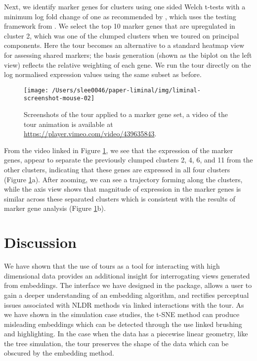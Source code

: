 \documentclass[article,notitle]{jdssv}
\begin{document}
Next, we identify marker genes for clusters using one sided Welch t-tests with
a minimum log fold change of one as recommended by \citet{Amezquita2020-at}, which
uses the testing framework from \citet{McCarthy2009-qx}. We select the top 10 marker
genes that are upregulated in cluster 2, which was one of the clumped clusters
when we toured on principal components. Here the tour becomes an alternative
to a standard heatmap view for assessing shared markers; the basis
generation (shown as the biplot on the left view) reflects the relative
weighting of each gene. We run the tour directly on the
log normalised expression values using the same subset as before.



\begin{figure}

{\centering \texttt{[image: /Users/slee0046/paper-liminal/img/liminal-screenshot-mouse-02]} 

}

\caption{Screenshots of the  tour applied to a marker gene set, a video of the tour animation is available at \url{https://player.vimeo.com/video/439635843}.}\label{fig:mouse-02}
\end{figure}

From the video linked in Figure \ref{fig:mouse-02}, we see that the
expression of the marker genes, appear to separate
the previously clumped clusters 2, 4, 6, and 11 from the other clusters,
indicating that these genes are expressed in all four clusters (Figure \ref{fig:mouse-02}a). After zooming, we can see a trajectory forming along
the clusters, while the axis view shows that magnitude of expression in
the marker genes is similar across these separated clusters which is
consistent with the results of marker gene analysis (Figure \ref{fig:mouse-02}b).

\hypertarget{discussion}{%
\section{Discussion}\label{discussion}}

We have shown that the use of tours as a tool for interacting with
high dimensional data provides an additional insight for interrogating views
generated from embeddings. The interface we have designed in the 
package, allows a user to gain a deeper understanding of an embedding
algorithm, and rectifies perceptual issues associated with NLDR methods via
linked interactions with the tour. As we have shown in the simulation case
studies, the t-SNE method can produce misleading embeddings which can be
detected through the use linked brushing and highlighting. In the case when
the data has a piecewise linear geometry, like the tree simulation, the tour
preserves the shape of the data which can be obscured by the embedding method.
\end{document}
